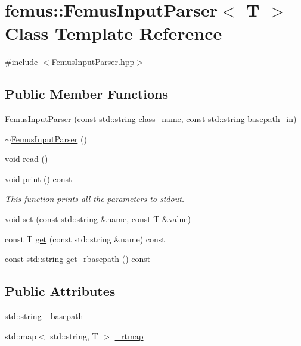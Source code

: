 \hypertarget{classfemus_1_1_femus_input_parser}{}\section{femus\+:\+:Femus\+Input\+Parser$<$ T $>$ Class Template Reference}
\label{classfemus_1_1_femus_input_parser}


{\ttfamily \#include $<$Femus\+Input\+Parser.\+hpp$>$}

\subsection*{Public Member Functions}
\begin{DoxyCompactItemize}
\item 
\mbox{\hyperlink{classfemus_1_1_femus_input_parser_a012881346421fc56c278db92d9b48858}{Femus\+Input\+Parser}} (const std\+::string class\+\_\+name, const std\+::string basepath\+\_\+in)
\item 
\mbox{\hyperlink{classfemus_1_1_femus_input_parser_a83fce921560f1f0a19e351e2f87248b5}{$\sim$\+Femus\+Input\+Parser}} ()
\item 
void \mbox{\hyperlink{classfemus_1_1_femus_input_parser_a5ac476036f43e888b305f2a4844e2e57}{read}} ()
\item 
void \mbox{\hyperlink{classfemus_1_1_femus_input_parser_a94ecc392927f6d03531d8f1e5904f157}{print}} () const
\begin{DoxyCompactList}\small\item\em This function prints all the parameters to stdout. \end{DoxyCompactList}\item 
void \mbox{\hyperlink{classfemus_1_1_femus_input_parser_acbc42027ebef9bad38afd4e0bdef4169}{set}} (const std\+::string \&name, const T \&value)
\item 
const T \mbox{\hyperlink{classfemus_1_1_femus_input_parser_a317bdaac200e745334dcd436d39d2832}{get}} (const std\+::string \&name) const
\item 
const std\+::string \mbox{\hyperlink{classfemus_1_1_femus_input_parser_a3b479c8cf9e6bbeb172e5ef1282ed096}{get\+\_\+rbasepath}} () const
\end{DoxyCompactItemize}
\subsection*{Public Attributes}
\begin{DoxyCompactItemize}
\item 
std\+::string \mbox{\hyperlink{classfemus_1_1_femus_input_parser_a7bc03b4cb89200a0c76547e3f169c8d3}{\+\_\+basepath}}
\item 
std\+::map$<$ std\+::string, T $>$ \mbox{\hyperlink{classfemus_1_1_femus_input_parser_ab5d6ea57ed37959267aa8cf3909d1422}{\+\_\+rtmap}}
\end{DoxyCompactItemize}


